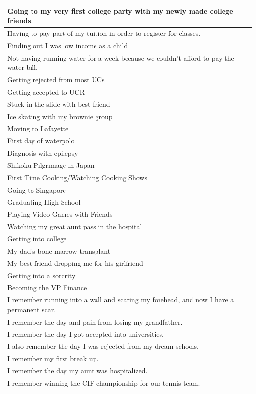 \documentclass[
  .7em,
  letterpaper,
  DIV=11,
  numbers=noendperiod]{scrartcl}
\begin{document}
\begin{table}
\begin{tabular}{l}
\hline
Going to my very first college party with my newly made college friends.\\
\hline
Having to pay part of my tuition in order to register for classes.\\
\hline
Finding out I was low income as a child\\
\hline
Not having running water for a week because we couldn't afford to pay the water bill.\\
\hline
Getting rejected from most UCs\\
\hline
Getting accepted to UCR\\
\hline
Stuck in the slide with best friend\\
\hline
Ice skating with my brownie group\\
\hline
Moving to Lafayette\\
\hline
First day of waterpolo\\
\hline
Diagnosis with epilepsy\\
\hline
Shikoku Pilgrimage in Japan\\
\hline
First Time Cooking/Watching Cooking Shows\\
\hline
Going to Singapore\\
\hline
Graduating High School\\
\hline
Playing Video Games with Friends\\
\hline
Watching my great aunt pass in the hospital\\
\hline
Getting into college\\
\hline
My dad's bone marrow transplant\\
\hline
My best friend dropping me for his girlfriend\\
\hline
Getting into a sorority\\
\hline
Becoming the VP Finance\\
\hline
I remember running into a wall and scaring my forehead, and now I have a permanent scar.\\
\hline
I remember the day and pain from losing my grandfather.\\
\hline
I remember the day I got accepted into universities.\\
\hline
I also remember the day I was rejected from my dream schools.\\
\hline
I remember my first break up.\\
\hline
I remember the day my aunt was hospitalized.\\
\hline
I remember winning the CIF championship for our tennis team.\\

\end{tabular}
\end{table}
\end{document}
